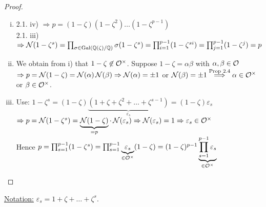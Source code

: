 \begin{proof}
\begin{enumerate}[i)]
\item 
2.1. iv) $\Rightarrow p= (1- \zeta)(1- \zeta^2) \dots (1-\zeta^{p-1})$\\
2.1. iii) $\Rightarrow \operatorname{\mathcal{N}}(1-\zeta^s)=\prod_{\sigma \in \operatorname{Gal}(\mathbb{Q}(\zeta)/ \mathbb{Q})} \sigma(1-\zeta^s) = \prod_{i=1}^{p-1} (1- \zeta^{si}) = \prod_{j=1}^{p-1}(1-\zeta^j)=p$
\item We obtain from i) that $1- \zeta \not\in \mathcal{O}^\times$. Suppose $1-\zeta = \alpha \beta$ with $\alpha, \beta \in \mathcal{O}$\\
$\Rightarrow p=\operatorname{\mathcal{N}}(1- \zeta)=\operatorname{\mathcal{N}}(\alpha)\operatorname{\mathcal{N}}(\beta) \Rightarrow \operatorname{\mathcal{N}}(\alpha) = \pm 1 $ or $\operatorname{\mathcal{N}}(\beta)=\pm 1 \stackrel{\text{Prop 2.4}}{\Longrightarrow} \alpha \in \mathcal{O}^\times$ or $\beta \in \mathcal{O}^\times$.
\item Use: $1-\zeta^s = (1-\zeta)\underbrace{(1+\zeta +\zeta^2+\dots+\zeta^{s-1})}_{\varepsilon_s} = (1-\zeta)\varepsilon_s$\\
$\Rightarrow p=\operatorname{\mathcal{N}}(1-\zeta^s)=\underbrace{\operatorname{\mathcal{N}}(1-\zeta)}_{=p}\cdot \operatorname{\mathcal{N}}(\varepsilon_s) \Rightarrow \operatorname{\mathcal{N}}(\varepsilon_s)=1 \Rightarrow \varepsilon_s \in \mathcal{O}^\times$\\
Hence $p = \prod_{s=1}^{p-1}(1-\zeta^s)=\prod_{s=1}^{p-1} \underbrace{\varepsilon_s}_{\in \mathcal{O}^\times} (1- \zeta) = (1- \zeta)^{p-1}\underbrace{\prod_{s=1}^{p-1} \varepsilon_s}_{\in \mathcal{O}^\times}$
\end{enumerate}
\end{proof}

\underline{Notation:} $\varepsilon_s = 1+ \zeta + \dots + \zeta^s$.

